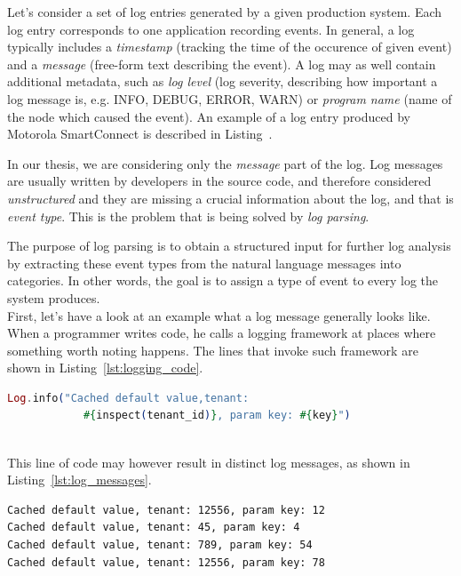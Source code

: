 Let's consider a set of log entries generated by a given production system. Each log entry corresponds to one application recording events. In general, a log typically includes a \textit{timestamp} (tracking the time of the occurence of given event) and a \textit{message} (free-form text describing the event). A log may as well contain additional metadata, such as \textit{log level} (log severity, describing how important a log message is, e.g. INFO, DEBUG, ERROR, WARN) or \textit{program name} (name of the node which caused the event). An example of a log entry produced by Motorola SmartConnect is described in Listing~.

In our thesis, we are considering only the \textit{message} part of the log. Log messages are usually written by developers in the source code, and therefore considered \textit{unstructured} and they are missing a crucial information about the log, and that is \textit{event type}.  This is the problem that is being solved by \textit{log parsing}. 

The purpose of log parsing is to obtain a structured input for further log analysis by extracting these event types from the natural language messages into categories.
In other words, the goal is to assign a type of event to every log the system produces. \\

First, let's have a look at  an example what a log message generally looks like.
When a programmer writes code, he calls a logging framework at places where something worth noting happens. The lines that invoke such framework are shown in Listing~\ref{lst:logging_code}.\\

\begin{lstlisting}[language=elixir, caption={Example of how logging is done in source code}, captionpos=b, label={lst:logging_code}]
Log.info("Cached default value,tenant: 
            #{inspect(tenant_id)}, param key: #{key}")
\end{lstlisting}
\\

This line of code may however result in distinct log messages, as shown in Listing~\ref{lst:log_messages}.\\

\begin{lstlisting}[label={lst:log_messages}, caption={Possible outputs of the code in Listing~\ref{lst:logging_code}}, captionpos=b]
Cached default value, tenant: 12556, param key: 12
Cached default value, tenant: 45, param key: 4
Cached default value, tenant: 789, param key: 54
Cached default value, tenant: 12556, param key: 78
\end{lstlisting}

